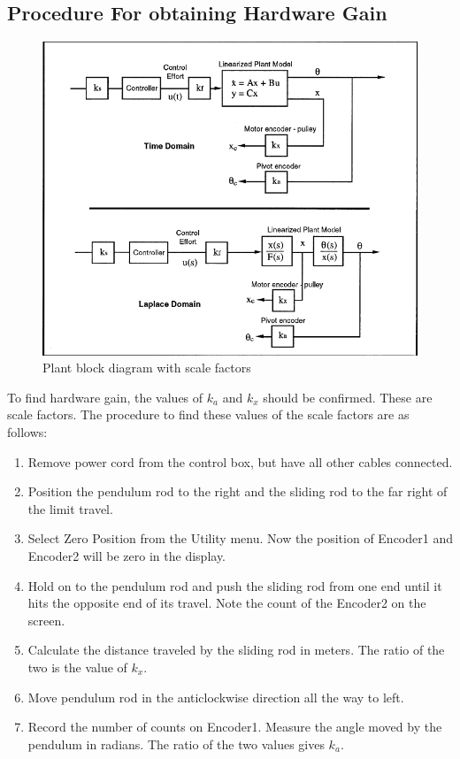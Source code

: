 \documentclass[12pt, a4paper]{article}
\begin{document}
\subsection{Procedure For obtaining Hardware Gain}
\begin{figure}[H]
\centering
\includegraphics[width = \textwidth]{kakx.png}
\caption{Plant block diagram with scale factors}
\label{Fig6}
\end{figure}
To find hardware gain, the values of $k_a$ and $k_x$ should be confirmed. These are scale factors. The procedure to find these values of the scale factors are as follows:
\begin{enumerate}
\item Remove power cord from the control box, but have all other cables connected.
\item Position the pendulum rod to the right and the sliding rod to the far right of the limit travel.
\item Select Zero Position from the Utility menu. Now the position of Encoder1 and Encoder2 will be zero in the display.
\item Hold on to the pendulum rod and push the sliding rod from one end until it hits the opposite end of its travel. Note the count of the Encoder2 on the screen.
\item Calculate the distance traveled by the sliding rod in meters. The ratio of the two is the value of $k_x$.
\item Move pendulum rod in the anticlockwise direction all the way to left.
\item Record the number of counts on Encoder1. Measure the angle moved by the pendulum in radians. The ratio of the two values gives $k_a$.
\end{enumerate}
\end{document}
